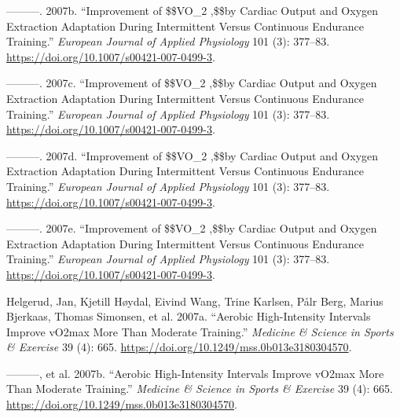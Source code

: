 \documentclass[
  letterpaper,
  DIV=11,
  numbers=noendperiod]{scrartcl}
\newlength{\cslhangindent}
\newlength{\cslentryspacingunit} %
\newenvironment{CSLReferences}[2] %
 {%
  \setlength{\parindent}{0pt}
  \ifodd #1
  \let\oldpar\par
  \def\par{\hangindent=\cslhangindent\oldpar}
  \fi
  \setlength{\parskip}{#2\cslentryspacingunit}
 }%
 {}
\begin{document}
\begin{CSLReferences}{1}{0}
\leavevmode{}%
---------. 2007b. {``Improvement of
{\$}{\$}\dot{\textbraceleft}V{\textbraceright}\hbox{\textbraceleft}O{\textbraceright}{\_}{\textbraceleft}2
\max{\textbraceright},{\$}{\$}by Cardiac Output and Oxygen Extraction
Adaptation During Intermittent Versus Continuous Endurance Training.''}
\emph{European Journal of Applied Physiology} 101 (3): 377--83.
\url{https://doi.org/10.1007/s00421-007-0499-3}.

\leavevmode{}%
---------. 2007c. {``Improvement of
{\$}{\$}\dot{\textbraceleft}V{\textbraceright}\hbox{\textbraceleft}O{\textbraceright}{\_}{\textbraceleft}2
\max{\textbraceright},{\$}{\$}by Cardiac Output and Oxygen Extraction
Adaptation During Intermittent Versus Continuous Endurance Training.''}
\emph{European Journal of Applied Physiology} 101 (3): 377--83.
\url{https://doi.org/10.1007/s00421-007-0499-3}.

\leavevmode{}%
---------. 2007d. {``Improvement of
{\$}{\$}\dot{\textbraceleft}V{\textbraceright}\hbox{\textbraceleft}O{\textbraceright}{\_}{\textbraceleft}2
\max{\textbraceright},{\$}{\$}by Cardiac Output and Oxygen Extraction
Adaptation During Intermittent Versus Continuous Endurance Training.''}
\emph{European Journal of Applied Physiology} 101 (3): 377--83.
\url{https://doi.org/10.1007/s00421-007-0499-3}.

\leavevmode{}%
---------. 2007e. {``Improvement of
{\$}{\$}\dot{\textbraceleft}V{\textbraceright}\hbox{\textbraceleft}O{\textbraceright}{\_}{\textbraceleft}2
\max{\textbraceright},{\$}{\$}by Cardiac Output and Oxygen Extraction
Adaptation During Intermittent Versus Continuous Endurance Training.''}
\emph{European Journal of Applied Physiology} 101 (3): 377--83.
\url{https://doi.org/10.1007/s00421-007-0499-3}.

\leavevmode{}%
Helgerud, Jan, Kjetill Høydal, Eivind Wang, Trine Karlsen, Pålr Berg,
Marius Bjerkaas, Thomas Simonsen, et al. 2007a. {``Aerobic
High-Intensity Intervals Improve v{\textperiodcentered}O2max More Than
Moderate Training.''} \emph{Medicine \& Science in Sports \& Exercise}
39 (4): 665. \url{https://doi.org/10.1249/mss.0b013e3180304570}.

\leavevmode{}%
---------, et al. 2007b. {``Aerobic High-Intensity Intervals Improve
v{\textperiodcentered}O2max More Than Moderate Training.''}
\emph{Medicine \& Science in Sports \& Exercise} 39 (4): 665.
\url{https://doi.org/10.1249/mss.0b013e3180304570}.


\end{CSLReferences}
\end{document}
